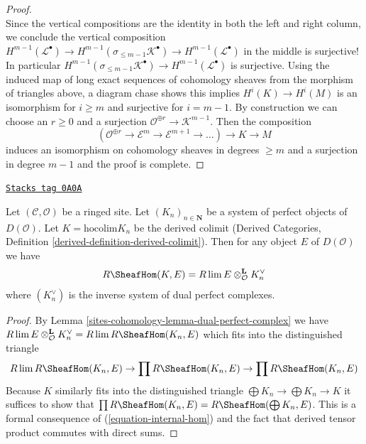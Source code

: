 \begin{proof}
$$$$
Since the vertical compositions are the identity in both the
left and right column, we conclude the vertical composition
$H^{m - 1}(\mathcal{L}^\bullet) \to
H^{m - 1}(\sigma_{\leq m - 1}\mathcal{K}^\bullet) \to
H^{m - 1}(\mathcal{L}^\bullet)$ in the middle is surjective!
In particular $H^{m - 1}(\sigma_{\leq m - 1}\mathcal{K}^\bullet) \to
H^{m - 1}(\mathcal{L}^\bullet)$ is surjective.
Using the induced map of long exact sequences of cohomology
sheaves from the morphism of triangles above, a diagram chase
shows this implies $H^i(K) \to H^i(M)$ is an isomorphism
for $i \geq m$ and surjective for $i = m - 1$.
By construction we can choose an $r \geq 0$ and a surjection
$\mathcal{O}^{\oplus r} \to \mathcal{K}^{m - 1}$. Then the
composition
$$
(\mathcal{O}^{\oplus r} \to \mathcal{E}^m \to
\mathcal{E}^{m + 1} \to \ldots ) \longrightarrow
K \longrightarrow M
$$
induces an isomorphism on cohomology sheaves in degrees $\geq m$ and
a surjection in degree $m - 1$ and the proof is complete.
\end{proof}

\begin{lemma}
\label{sites-cohomology-lemma-colim-and-lim-of-duals}
\href{https://stacks.math.columbia.edu/tag/0A0A}{\texttt{Stacks tag 0A0A}}


Let $(\mathcal{C}, \mathcal{O})$ be a ringed site. Let
$(K_n)_{n \in \mathbf{N}}$ be a system of perfect objects of $D(\mathcal{O})$.
Let $K = \text{hocolim} K_n$ be the derived colimit
(Derived Categories, Definition \ref{derived-definition-derived-colimit}).
Then for any object $E$ of $D(\mathcal{O})$ we have
$$
R\SheafHom(K, E) = R\lim E \otimes^\mathbf{L}_\mathcal{O} K_n^\vee
$$
where $(K_n^\vee)$ is the inverse system of dual perfect complexes.
\end{lemma}

\begin{proof}
By Lemma \ref{sites-cohomology-lemma-dual-perfect-complex} we have
$R\lim E \otimes^\mathbf{L}_\mathcal{O} K_n^\vee =
R\lim R\SheafHom(K_n, E)$
which fits into the distinguished triangle
$$
R\lim R\SheafHom(K_n, E) \to
\prod R\SheafHom(K_n, E) \to
\prod R\SheafHom(K_n, E)
$$
Because $K$ similarly fits into the distinguished triangle
$\bigoplus K_n \to \bigoplus K_n \to K$ it suffices to show that
$\prod R\SheafHom(K_n, E) = R\SheafHom(\bigoplus K_n, E)$.
This is a formal consequence of (\ref{equation-internal-hom})
and the fact that derived tensor product commutes with direct sums.
\end{proof}

